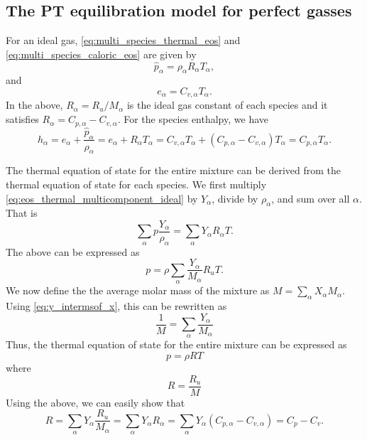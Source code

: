\documentclass[oneside,a4paper,11pt]{report}
\begin{document}
\subsection{The PT equilibration model for perfect gasses}
For an ideal gas, \cref{eq:multi_species_thermal_eos} and \cref{eq:multi_species_caloric_eos} are given by
\begin{equation}
\label{eq:eos_thermal_multicomponent_ideal}
\hat{p}_\alpha = \rho_\alpha R_\alpha T_\alpha,
\end{equation}
and
\begin{equation} 
\label{eq:eos_caloric_multicomponent_ideal}
e_\alpha = C_{v,\alpha} T_\alpha .
\end{equation}
In the above, $R_\alpha = R_u / M_\alpha$ is the ideal gas constant of each species and it satisfies $R_\alpha = C_{p,\alpha} - C_{v,\alpha}$. For the species enthalpy, we have
\begin{equation}
    h_\alpha = e_\alpha + \frac{\hat{p}_\alpha}{\rho_\alpha} = e_\alpha + R_\alpha T_\alpha = C_{v,\alpha} T_\alpha + \left ( C_{p,\alpha} - C_{v,\alpha} \right ) T_\alpha = C_{p,\alpha} T_\alpha.
\end{equation}

The thermal equation of state for the entire mixture can be derived from the thermal equation of state for each species. We first multiply \cref{eq:eos_thermal_multicomponent_ideal} by $Y_\alpha$, divide by $\rho_\alpha$, and sum over all $\alpha$. That is
\begin{equation}
\sum_\alpha p \frac{Y_\alpha}{\rho_\alpha}= \sum_\alpha Y_\alpha R_\alpha T.
\end{equation}
The above can be expressed as
\begin{equation}
p = \rho \sum_\alpha \frac{Y_\alpha}{M_\alpha} R_u T.
\end{equation}
We now define the the average molar mass of the mixture as $M = \sum_\alpha X_\alpha M_\alpha$. Using \cref{eq:y_intermsof_x}, this can be rewritten as 
\begin{equation}
    \frac{1}{M} = \sum_\alpha \frac{Y_\alpha}{M_\alpha}
\end{equation}
Thus, the thermal equation of state for the entire mixture can be expressed as
\begin{equation}
    p = \rho R T
\end{equation}
where
\begin{equation}
R = \frac{R_u}{M}
\end{equation}
Using the above, we can easily show that
\begin{equation}
    R = \sum_\alpha Y_\alpha \frac{R_u}{M_\alpha} = \sum_\alpha Y_\alpha R_\alpha = \sum_\alpha Y_\alpha \left ( C_{p,\alpha} - C_{v,\alpha} \right ) = C_p - C_v.
\end{equation}
\end{document}
